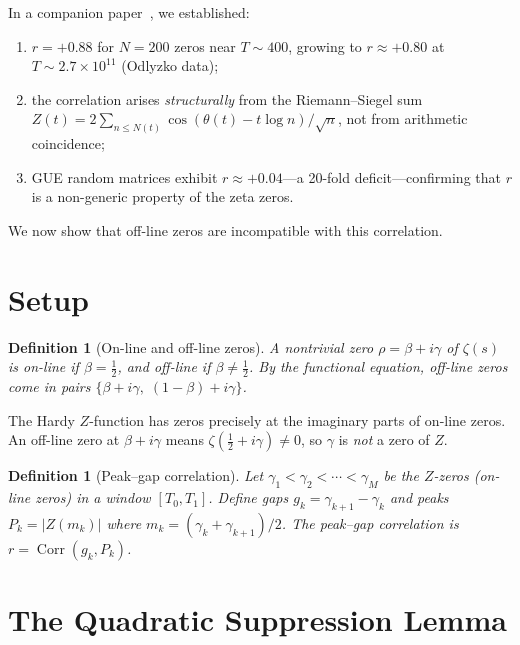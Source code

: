 \documentclass[11pt,a4paper]{article}
\newtheorem{definition}[theorem]{Definition}
\DeclareMathOperator{\Corr}{Corr}
\begin{document}
In a companion paper~\cite{EigRigidity}, we established:
\begin{enumerate}
\item $r = +0.88$ for $N = 200$ zeros near $T \sim 400$, growing to $r \approx +0.80$ at $T \sim 2.7 \times 10^{11}$ (Odlyzko data);
\item the correlation arises \emph{structurally} from the Riemann--Siegel sum $Z(t) = 2\sum_{n \leq N(t)} \cos(\theta(t) - t\log n)/\sqrt{n}$, not from arithmetic coincidence;
\item GUE random matrices exhibit $r \approx +0.04$---a 20-fold deficit---confirming that $r$ is a non-generic property of the zeta zeros.
\end{enumerate}

We now show that off-line zeros are incompatible with this correlation.


\section{Setup}

\begin{definition}[On-line and off-line zeros]
A nontrivial zero $\rho = \beta + i\gamma$ of $\zeta(s)$ is \emph{on-line} if $\beta = \frac{1}{2}$, and \emph{off-line} if $\beta \neq \frac{1}{2}$.
By the functional equation, off-line zeros come in pairs $\{\beta + i\gamma,\; (1-\beta) + i\gamma\}$.
\end{definition}

The Hardy $Z$-function has zeros precisely at the imaginary parts of on-line zeros.
An off-line zero at $\beta + i\gamma$ means $\zeta(\tfrac{1}{2} + i\gamma) \neq 0$, so $\gamma$ is \emph{not} a zero of $Z$.

\begin{definition}[Peak--gap correlation]
Let $\gamma_1 < \gamma_2 < \cdots < \gamma_M$ be the $Z$-zeros (on-line zeros) in a window $[T_0, T_1]$.
Define gaps $g_k = \gamma_{k+1} - \gamma_k$ and peaks $P_k = |Z(m_k)|$ where $m_k = (\gamma_k + \gamma_{k+1})/2$.
The peak--gap correlation is $r = \Corr(g_k, P_k)$.
\end{definition}


\section{The Quadratic Suppression Lemma}
\end{document}
